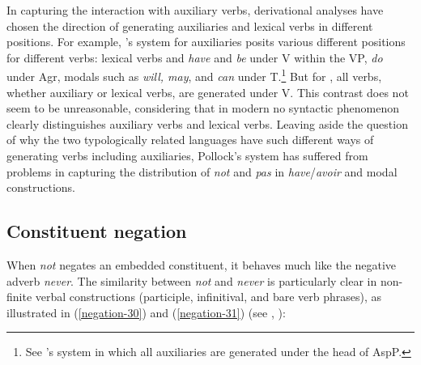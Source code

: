 \documentclass[output=paper
 	        ,biblatex
                ,babelshorthands
                ,newtxmath
                ,draftmode
                ,colorlinks, citecolor=brown
]{langscibook}
\begin{document}
\begin{exe}
\begin{xlist}
\begin{exe}
\begin{xlist}
{In capturing the interaction with auxiliary verbs, derivational analyses have chosen the direction of generating
auxiliaries and lexical  verbs in different positions. For example,
\citet{Pollock:89}'s system for  auxiliaries posits
various different positions for different verbs: lexical
verbs and \textit{have} and \textit{be} under V within the VP,
\textit{do} under Agr, modals such as \textit{will, may}, and \textit{can}
under T.\footnote{See \citep{Ouhalla:91}'s system in which
all auxiliaries are generated under the head of AspP.} But for ,
all verbs, whether
auxiliary or lexical  verbs, are generated under V.
This contrast does not seem to be unreasonable, considering that in
modern  no syntactic phenomenon clearly distinguishes auxiliary
verbs and lexical  verbs. Leaving aside the question of why the two
typologically related languages have such different ways of generating
verbs including auxiliaries, Pollock's system has suffered
from problems in capturing the distribution of \textit{not} and
\textit{pas} in \textit{have}/\textit{avoir} and modal constructions.}
\fi

\subsection{Constituent negation}

When  \textit{not} negates an embedded constituent, it behaves
much like the negative adverb \textit{never}. The similarity between {\it
not} and \textit{never} is particularly clear in non-finite verbal
constructions (participle, infinitival, and bare verb phrases), as
illustrated in (\ref{negation-30}) and (\ref{negation-31}) (see \citealt{Klima:64,Kim:00},
\citealt[]{kimmichaelis:2020}):

\eal\label{negation-30}
\zl


\end{xlist}
\end{exe}
\end{xlist}
\end{exe}
\end{document}
